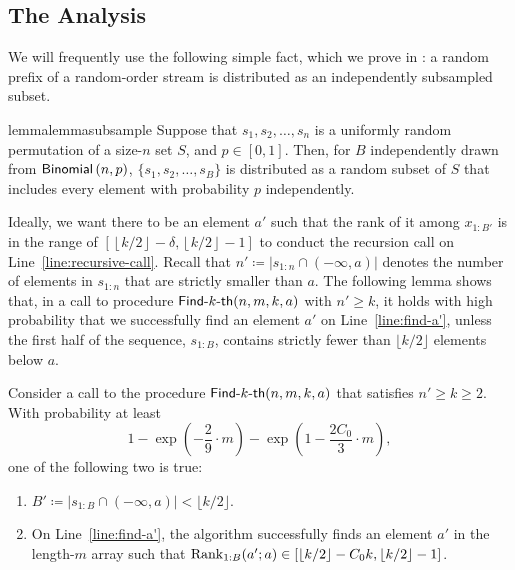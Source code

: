 \subsection{The Analysis}

We will frequently use the following simple fact, which we prove in : a random prefix of a random-order stream is distributed as an independently subsampled subset.
\begin{restatable}{lemma}{lemmasubsample}\label{lemma:subsample}
    Suppose that $s_1, s_2, \ldots, s_n$ is a uniformly random permutation of a size-$n$ set $S$, and $p \in [0, 1]$. Then, for $B$ independently drawn from $\mathsf{Binomial}\left(n, p\right)$, $\{s_1, s_2, \ldots, s_B\}$ is distributed as a random subset of $S$ that includes every element with probability $p$ independently.
\end{restatable}

Ideally, we want there to be an element $a'$ such that the rank of it among $x_{1:B'}$ is in the range of $\left[\left\lfloor k/2 \right\rfloor - \delta, \left\lfloor k/2 \right\rfloor - 1\right]$ to conduct the recursion call on Line~\ref{line:recursive-call}. Recall that $n' \coloneqq |s_{1:n} \cap (-\infty, a)|$ denotes the number of elements in $s_{1:n}$ that are strictly smaller than $a$. The following lemma shows that, in a call to procedure $\textsf{Find-}k\textsf{-th}(n, m, k, a)$ with $n' \ge k$, it holds with high probability that we successfully find an element $a'$ on Line~\ref{line:find-a'}, unless the first half of the sequence, $s_{1:B}$, contains strictly fewer than $\lfloor k/2 \rfloor$ elements below $a$.

\begin{lemma}\label{lemma:prob-find-a'}
    Consider a call to the procedure $\textsf{Find-}k\textsf{-th}(n, m, k, a)$ that satisfies $n' \ge k \ge 2$. With probability at least 
    \[
        1 - \exp\left(-\frac{2}{9}\cdot m\right) - \exp\left(1-\frac{2C_0}{3}\cdot m\right),
    \]
    one of the following two is true:
    \begin{enumerate}
        \item $B' \coloneqq |s_{1:B} \cap (-\infty, a)| < \lfloor k / 2\rfloor$.
        \item On Line~\ref{line:find-a'}, the algorithm successfully finds an element $a'$ in the length-$m$ array such that $\mathrm{Rank}_{1:B}(a'; a) \in [\lfloor k /2 \rfloor - C_0k, \lfloor k /2 \rfloor - 1]$.
    \end{enumerate}
\end{lemma}

